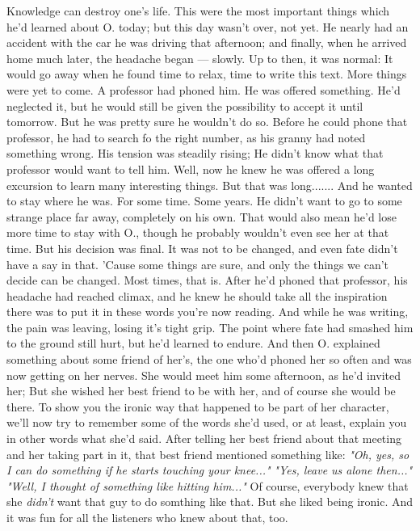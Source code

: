 Knowledge can destroy one's life. 
This were the most important things which he'd learned about O. today; but this day wasn't over, not yet. 
He nearly had an accident with the car he was driving that afternoon; and finally, when he arrived home much later, the headache began --- slowly. 
Up to then, it was normal: It would go away when he found time to relax, time to write this text. 
More things were yet to come. 
A professor had phoned him. 
He was offered something. 
He'd neglected it, but he would still be given the possibility to accept it until tomorrow. 
But he was pretty sure he wouldn't do so. 
Before he could phone that professor, he had to search fo the right number, as his granny had noted something wrong. 
His tension was steadily rising; He didn't know what that professor would want to tell him. 
Well, now he knew he was offered a long excursion to learn many interesting things. 
But that was long.......
And he wanted to stay where he was. 
For some time. 
Some years. 
He didn't want to go to some strange place far away, completely on his own. 
That would also mean he'd lose more time to stay with O., though he probably wouldn't even see her at that time. 
But his decision was final. 
It was not to be changed, and even fate didn't have a say in that. 
'Cause some things are sure, and only the things we can't decide can be changed. 
Most times, that is. 
After he'd phoned that professor, his headache had reached climax, and he knew he should take all the inspiration there was to put it in these words you're now reading. 
And while he was writing, the pain was leaving, losing it's tight grip. 
The point where fate had smashed him to the ground still hurt, but he'd learned to endure. 
And then O. explained something about some friend of her's, the one who'd phoned her so often and was now getting on her nerves. 
She would meet him some afternoon, as he'd invited her; But she wished her best friend to be with her, and of course she would be there. 
To show you the ironic way that happened to be part of her character, we'll now try to remember some of the words she'd used, or at least, explain you in other words what she'd said. 
After telling her best friend about that meeting and her taking part in it, that best friend mentioned something like: 
\emph{"Oh, yes, so I can do something if he starts touching your knee..."}
\emph{"Yes, leave us alone then..."}
\emph{"Well, I thought of something like hitting him..."}
Of course, everybody knew that she \emph{didn't} want that guy to do somthing like that. 
But she liked being ironic. 
And it was fun for all the listeners who knew about that, too. 

